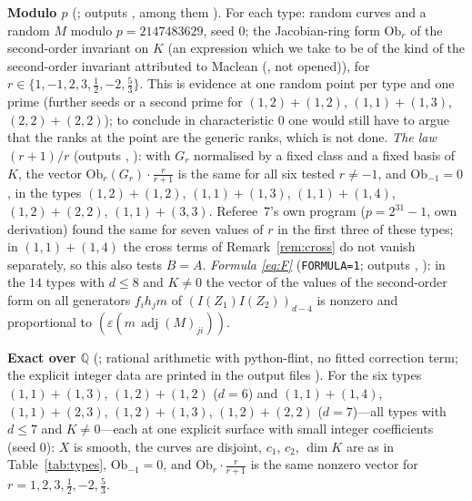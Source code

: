 \documentclass[11pt]{article}
\numberwithin{equation}{section}
\theoremstyle{remark}
\newcommand{\QQ}{\mathbb{Q}}
\newcommand{\adj}{\operatorname{adj}}
\newcommand{\Ob}{\mathrm{Ob}}
\newcommand{\run}[1]{\medskip\noindent\textbf{#1}}
\begin{document}
\begin{table}[!t]
\caption{All types with $d\le8$, and one with $d=10$. Numerical columns: Propositions \ref{prop:first},
\ref{prop:excess} (proved; recomputed by referees~7 and~8). The last three columns are separate supports for
$A\not\equiv0$: \emph{proved} by Theorem~A(6), with the curve for which (H) is proved by hand; \emph{exact} over
$\QQ$ at one explicit surface, resp.\ \emph{Lean}-certified finite computation at one sextic; \emph{modulo $p$}
at one random point ($\Ob_r\ne0$ for $r\in\{1,2,3,\frac12,-2,\frac53\}$, $\Ob_{-1}=0$). The entries ``$\Ob$'',
``Lean'' and ``mod $p$'' are conditional on the $\Ob$-link (``Lean'' also on smoothness and disjointness); ``mod $p$'' is not lifted to characteristic $0$.
$^\dagger$: $K$ is larger than $(I(Z_1)I(Z_2))_{d-4}$, on which alone \eqref{eq:F} describes $A$.}\label{tab:types}
\end{table}

\run{Modulo $p$} (; outputs , among them
). For each type: random curves and a random $M$ modulo $p=2147483629$, seed $0$; the
Jacobian-ring form $\Ob_r$ of the second-order invariant on $K$ (an expression which we take to be of the kind of the
second-order invariant attributed to Maclean (\cite{Mac}, not opened)), for $r\in\{1,-1,2,3,\frac12,-2,\frac53\}$. This is evidence at one random point per type
and one prime (further seeds or a second prime for $(1,2)+(1,2)$, $(1,1)+(1,3)$, $(2,2)+(2,2)$); to conclude in
characteristic $0$ one would still have to argue that the ranks at the point are the generic ranks, which is
not done. \emph{The law $(r+1)/r$} (outputs , ): with $G_r$
normalised by a fixed class and a fixed basis of $K$, the vector $\Ob_r(G_r)\cdot\frac{r}{r+1}$ is the same for
all six tested $r\ne-1$, and $\Ob_{-1}=0$, in the types $(1,2)+(1,2)$, $(1,1)+(1,3)$, $(1,1)+(1,4)$,
$(1,2)+(2,2)$, $(1,1)+(3,3)$. Referee~7's own program ($p=2^{31}-1$, own derivation) found the same for seven
values of $r$ in the first three of these types; in $(1,1)+(1,4)$ the cross terms of Remark~\ref{rem:cross} do
not vanish separately, so this also tests $B=A$. \emph{Formula \eqref{eq:F}} (\texttt{FORMULA=1}; outputs
, ): in the $14$ types with $d\le8$ and $K\ne0$ the vector of
the values of the second-order form on all generators $f_ih_jm$ of $(I(Z_1)I(Z_2))_{d-4}$ is nonzero and
proportional to $(\varepsilon(m\,\adj(M)_{ji}))$.

\run{Exact over $\QQ$} (; rational arithmetic with python-flint, no fitted
correction term; the explicit integer data are printed in the output files ). For the six
types $(1,1)+(1,3)$, $(1,2)+(1,2)$ ($d=6$) and $(1,1)+(1,4)$, $(1,1)+(2,3)$, $(1,2)+(1,3)$, $(1,2)+(2,2)$
($d=7$)---all types with $d\le7$ and $K\ne0$---each at one explicit surface with small integer coefficients
(seed $0$): $X$ is smooth, the curves are disjoint, $c_1$, $c_2$, $\dim K$ are as in Table~\ref{tab:types},
$\Ob_{-1}=0$, and $\Ob_r\cdot\frac{r}{r+1}$ is the same nonzero vector for $r=1,2,3,\frac12,-2,\frac53$.
\end{document}
